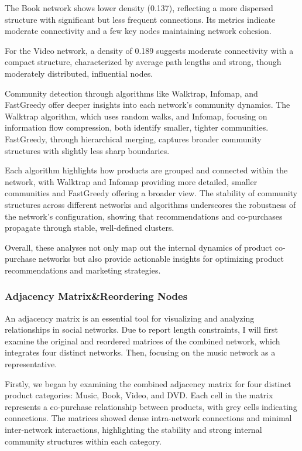 \documentclass[
]{article}
\begin{document}
The Book network shows lower density (0.137), reflecting a more
dispersed structure with significant but less frequent connections. Its
metrics indicate moderate connectivity and a few key nodes maintaining
network cohesion.

For the Video network, a density of 0.189 suggests moderate connectivity
with a compact structure, characterized by average path lengths and
strong, though moderately distributed, influential nodes.

Community detection through algorithms like Walktrap, Infomap, and
FastGreedy offer deeper insights into each network's community dynamics.
The Walktrap algorithm, which uses random walks, and Infomap, focusing
on information flow compression, both identify smaller, tighter
communities. FastGreedy, through hierarchical merging, captures broader
community structures with slightly less sharp boundaries.

Each algorithm highlights how products are grouped and connected within
the network, with Walktrap and Infomap providing more detailed, smaller
communities and FastGreedy offering a broader view. The stability of
community structures across different networks and algorithms
underscores the robustness of the network's configuration, showing that
recommendations and co-purchases propagate through stable, well-defined
clusters.

Overall, these analyses not only map out the internal dynamics of
product co-purchase networks but also provide actionable insights for
optimizing product recommendations and marketing strategies.

\subsubsection{Adjacency Matrix\&Reordering
Nodes}\label{adjacency-matrixreordering-nodes}

An adjacency matrix is an essential tool for visualizing and analyzing
relationships in social networks. Due to report length constraints, I
will first examine the original and reordered matrices of the combined
network, which integrates four distinct networks. Then, focusing on the
music network as a representative.

Firstly, we began by examining the combined adjacency matrix for four
distinct product categories: Music, Book, Video, and DVD. Each cell in
the matrix represents a co-purchase relationship between products, with
grey cells indicating connections. The matrices showed dense
intra-network connections and minimal inter-network interactions,
highlighting the stability and strong internal community structures
within each category.
\end{document}
